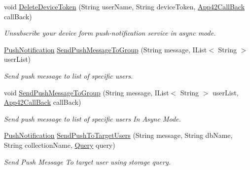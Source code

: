 \begin{DoxyCompactItemize}
void \hyperlink{classcom_1_1shephertz_1_1app42_1_1paas_1_1sdk_1_1csharp_1_1push_notification_1_1_push_notification_service_a77699e05b9e14c1225aa8c377bbd86e9}{Delete\+Device\+Token} (String user\+Name, String device\+Token, \hyperlink{interfacecom_1_1shephertz_1_1app42_1_1paas_1_1sdk_1_1csharp_1_1_app42_call_back}{App42\+Call\+Back} call\+Back)
\begin{DoxyCompactList}\small\item\em Unsubscribe your device form push-\/notification service in async mode. \end{DoxyCompactList}\item 
\hyperlink{classcom_1_1shephertz_1_1app42_1_1paas_1_1sdk_1_1csharp_1_1push_notification_1_1_push_notification}{Push\+Notification} \hyperlink{classcom_1_1shephertz_1_1app42_1_1paas_1_1sdk_1_1csharp_1_1push_notification_1_1_push_notification_service_acf16725b2a41cc1933f29b972b3c60f6}{Send\+Push\+Message\+To\+Group} (String message, I\+List$<$ String $>$ user\+List)
\begin{DoxyCompactList}\small\item\em Send push message to list of specific users. \end{DoxyCompactList}\item 
void \hyperlink{classcom_1_1shephertz_1_1app42_1_1paas_1_1sdk_1_1csharp_1_1push_notification_1_1_push_notification_service_a454d05a656a2c194131e38218bea3581}{Send\+Push\+Message\+To\+Group} (String message, I\+List$<$ String $>$ user\+List, \hyperlink{interfacecom_1_1shephertz_1_1app42_1_1paas_1_1sdk_1_1csharp_1_1_app42_call_back}{App42\+Call\+Back} call\+Back)
\begin{DoxyCompactList}\small\item\em Send push message to list of specific users In Async Mode. \end{DoxyCompactList}\item 
\hyperlink{classcom_1_1shephertz_1_1app42_1_1paas_1_1sdk_1_1csharp_1_1push_notification_1_1_push_notification}{Push\+Notification} \hyperlink{classcom_1_1shephertz_1_1app42_1_1paas_1_1sdk_1_1csharp_1_1push_notification_1_1_push_notification_service_ae3cad912fa6816cbdd131b7966c91298}{Send\+Push\+To\+Target\+Users} (String message, String db\+Name, String collection\+Name, \hyperlink{classcom_1_1shephertz_1_1app42_1_1paas_1_1sdk_1_1csharp_1_1storage_1_1_query}{Query} query)
\begin{DoxyCompactList}\small\item\em Send Push Message To target user using storage query. \end{DoxyCompactList}\item 

\end{DoxyCompactItemize}
